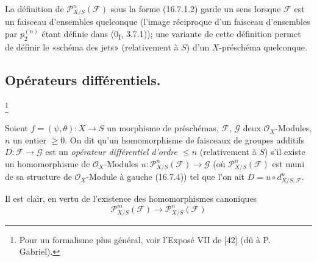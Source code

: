 \begin{remark}[16.7.10]
\label{IV.16.7.10}
La définition de $\mathscr{P}_{X/S}^n(\mathscr{F})$ sous la forme (16.7.1.2)
garde un sens lorsque $\mathscr{F}$ est un faisceau d'ensembles quelconque
(l'image réciproque d'un faisceau d'ensembles par $p_2^{(n)}$ étant définie
dans (0\textsubscript{I}, 3.7.1)); une variante de cette définition permet de
définir le «schéma des jets» (relativement à $S$) d'un $X$-préschéma
quelconque.
\end{remark}

\subsection{Opérateurs différentiels.}
\footnote{Pour un formalisme plus général, voir l'Exposé VII de [42]
(dû à P. Gabriel).}

\begin{definition}[16.8.1]
Soient $f=(\psi,\theta):X\to S$ un morphisme de préschémas,
$\mathscr{F}$, $\mathscr{G}$ deux $\mathcal{O}_X$-Modules, $n$ un entier
$\geq0$. On dit qu'un homomorphisme de faisceaux de groupes additifs
$D:\mathscr{F}\to\mathscr{G}$ est un \emph{opérateur différentiel d'ordre
$\leq n$} (relativement à $S$) s'il existe un homomorphisme de
$\mathcal{O}_X$-Modules
$u:\mathscr{P}_{X/S}^n(\mathscr{F})\to\mathscr{G}$ (où
$\mathscr{P}_{X/S}^n(\mathscr{F})$ est muni de sa structure de
$\mathcal{O}_X$-Module à gauche (16.7.4)) tel que l'on ait
$D=u\circ d_{X/S,\mathscr{F}}^n$.
\end{definition}

Il est clair, en vertu de l'existence des homomorphismes canoniques
\[
  \mathscr{P}_{X/S}^m(\mathscr{F})
  \longrightarrow\mathscr{P}_{X/S}^n(\mathscr{F})
\]
